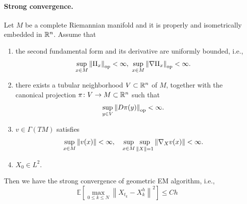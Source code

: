 \paragraph{Strong convergence.} Let $M$ be a complete Riemannian manifold and it is properly and isometrically embedded in $\mathbb{R}^n$. Assume that
\begin{enumerate}[label=(\Roman*)]
    \item\label{assum:conv_gem_1} the second fundamental form and its derivative are uniformly bounded, i.e.,
    \begin{equation*}
        \sup_{x \in M} \left\lVert\mathrm{II}_x\right\lVert_{\operatorname{op}} < \infty,~ \sup_{x \in M}\left\lVert\nabla\mathrm{II}_x\right\lVert_{\operatorname{op}} < \infty.
    \end{equation*}
    \item\label{assum:conv_gem_2} there exists a tubular neighborhood $V \subset \mathbb{R}^n$ of $M$, together with the canonical projection $\pi \colon V \rightarrow M \subset \mathbb{R}^n$ such that
    \begin{equation*}
        \sup_{y \in V} \left\lVert D\pi(y)\right\lVert_{\operatorname{op}} < \infty.
    \end{equation*}
    \item\label{assum:conv_gem_3} $v \in \Gamma(TM)$ satisfies
    \begin{equation*}
        \sup_{x \in M} \left\lVert v(x)\right\lVert < \infty,\quad \sup_{x \in M} \sup_{\left\lVert X\right\lVert = 1} \left\lVert\nabla_X v(x)\right\lVert < \infty.
    \end{equation*}
    \item\label{assum:conv_gem_4} $X_0 \in L^2$.
\end{enumerate}
Then we have the strong convergence of geometric EM algorithm, i.e.,
\begin{equation*}
    \mathbb{E}\left[\max _{0 \leq k \leq N} \left\|X_{t_k}- X_k^h\right\|^2\right] \leq C h
\end{equation*}
